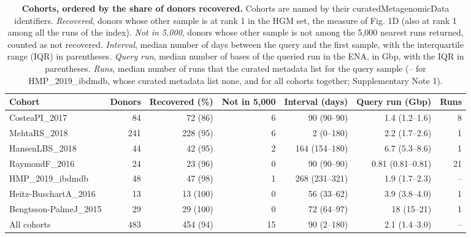 \documentclass[11pt,a4paper]{article}
\begin{document}
\setcounter{table}{10}
\begin{table}[!htbp]\centering\footnotesize\setlength{\tabcolsep}{4pt}
\caption[Cohorts, ordered by the share of donors recovered]{\textbf{Cohorts, ordered by the share of donors recovered.} Cohorts are named by their curatedMetagenomicData identifiers. \textit{Recovered}, donors whose other sample is at rank 1 in the HGM set, the measure of Fig. 1D (also at rank 1 among all the runs of the index). \textit{Not in 5,000}, donors whose other sample is not among the 5,000 nearest runs returned, counted as not recovered. \textit{Interval}, median number of days between the query and the first sample, with the interquartile range (IQR) in parentheses. \textit{Query run}, median number of bases of the queried run in the ENA, in Gbp, with the IQR in parentheses. \textit{Runs}, median number of runs that the curated metadata list for the query sample (-- for HMP\_2019\_ibdmdb, whose curated metadata list none, and for all cohorts together; Supplementary Note 1).}
\begin{tabular}{lrrrrrr}
\toprule
Cohort & Donors & Recovered (\%) & Not in 5,000 & Interval (days) & Query run (Gbp) & Runs \\
\midrule
CosteaPI\_2017 & 84 & 72 (86) & 6 & 90 (90--90) & 1.4 (1.2--1.6) & 8 \\
MehtaRS\_2018 & 241 & 228 (95) & 6 & 2 (0--180) & 2.2 (1.7--2.6) & 1 \\
HansenLBS\_2018 & 44 & 42 (95) & 2 & 164 (154--180) & 6.7 (5.3--8.6) & 1 \\
RaymondF\_2016 & 24 & 23 (96) & 0 & 90 (90--90) & 0.81 (0.81--0.81) & 21 \\
HMP\_2019\_ibdmdb & 48 & 47 (98) & 1 & 268 (231--321) & 1.9 (1.7--2.3) & -- \\
Heitz-BuschartA\_2016 & 13 & 13 (100) & 0 & 56 (33--62) & 3.9 (3.8--4.0) & 1 \\
Bengtsson-PalmeJ\_2015 & 29 & 29 (100) & 0 & 72 (64--97) & 18 (15--21) & 1 \\
\midrule
All cohorts & 483 & 454 (94) & 15 & 90 (2--180) & 2.1 (1.4--3.0) & -- \\
\bottomrule
\end{tabular}
\end{table}
\end{document}
